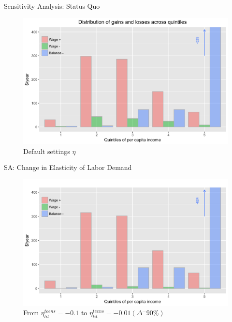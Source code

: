 \documentclass{beamer}
\def\white{\color{white}}
\begin{document}
\begin{frame}[noframenumbering]{Sensitivity Analysis: Status Quo}
\begin{figure}[h!]
\centering
\hspace*{-3em}
\includegraphics[scale = 0.13]{../Images/policy_est}
\caption{Default settings {\white $ \eta $} }
\end{figure}	
\end{frame}

\begin{frame}{SA: Change in Elasticity of Labor Demand}
\begin{figure}[h!]
\centering
\hspace*{-3em}
\includegraphics[scale = 0.13]{../Images/policy_est_eta001}
\caption{From $\eta^{teens}_{lit} = - 0.1$ to  $\eta^{teens}_{lit} = - 0.01(\Delta^{-}90\%)$}
\end{figure}	
\end{frame}
\end{document}
